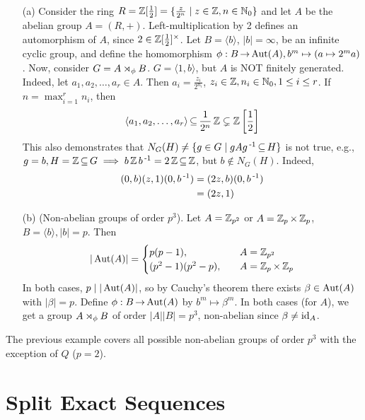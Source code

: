 \documentclass[11pt]{book}
\theoremstyle{definition}   \newtheorem{defn}[counter]{Definition} %
\newcommand{\gen}[1]{\langle #1 \rangle}   \newcommand{\stab}[2]{\tn{Stab}_{#1}(#2)}   \newcommand{\fix}[2]{\tn{Fix}_{#1}(#2)}
\DeclareMathOperator{\ra}{\rightarrow}   \DeclareMathOperator{\Poly}{\mathbf{P}}   \DeclareMathOperator{\spn}{\textnormal{span}}   \DeclareMathOperator{\aut}{\textnormal{Aut}}
\newcommand{\vs}{\vspace{8pt}}
\numberwithin{counter}{chapter}
\begin{document}
\vs

\begin{example}
\
\begin{enumerate}
\item[(a)] Consider the ring $R = \operatorname{\mathbb{Z}}[\frac{1}{2}] = \{\frac{z}{2^n} \mid z \in \operatorname{\mathbb{Z}}, n \in \operatorname{\mathbb{N}}_0\}$ and let $A$ be the abelian group $A = (R,+)$. Left-multiplication by 2 defines an automorphism of $A$, since $2 \in \operatorname{\mathbb{Z}}[\frac{1}{2}]^{\times}$. Let $B = \gen{b}$, $|b| = \infty$, be an infinite cyclic group, and define the homomorphism $\phi : B \ra \aut(A), b^m \mapsto (a \mapsto 2^m a)$. Now, consider $G = A \rtimes_{\phi} B$. $G = \gen{1,b}$, but $A$ is NOT finitely generated. Indeed, let $a_1,a_2,\dots,a_r \in A$. Then $a_i = \frac{z_i}{2^{n_i}}$, $z_i \in \operatorname{\mathbb{Z}}, n_i \in \operatorname{\mathbb{N}}_0, 1 \leq i \leq r$. If $n = \max_{i=1}^r n_i$, then
	\[\gen{a_1,a_2,\dots,a_r} \sub \frac{1}{2^n} \z \subsetneq \z\left[\frac{1}{2}\right] \]
This also demonstrates that $N_G(H) \ne \{g \in G \mid gAg\operatorname{^{-1}} \operatorname{\subseteq} H\}$ is not true, e.g., $g = b, H = \operatorname{\mathbb{Z}} \operatorname{\subseteq} G \implies b\operatorname{\mathbb{Z}} b\operatorname{^{-1}} = 2\operatorname{\mathbb{Z}} \operatorname{\subseteq} \operatorname{\mathbb{Z}}$, but $b \notin N_G(H)$. Indeed,
	\begin{align*}
	(0,b)(z,1)(0,b\operatorname{^{-1}}) &= (2z,b)(0,b\operatorname{^{-1}}) \\
	&= (2z,1)
	\end{align*}

\item[(b)] (Non-abelian groups of order $p^3$). Let $A = \operatorname{\mathbb{Z}}_{p^2}$ or $A = \operatorname{\mathbb{Z}}_p \times \operatorname{\mathbb{Z}}_p$, $B = \gen{b}, |b| = p$. Then
	\[ |\aut(A)| = \begin{cases}
	p(p-1), \quad & A = \z_{p^2} \\
	(p^2-1)(p^2-p), \quad & A = \z_p \times \z_p
	\end{cases} \]
In both cases, $p \mid |\aut(A)|$, so by Cauchy's theorem there exists $\beta \in \aut(A)$ with $|\beta| = p$. Define $\phi : B \ra \aut(A)$ by $b^m \mapsto \beta^m$. In both cases (for $A$), we get a group $A \rtimes_{\phi} B$ of order $|A| |B| = p^3$, non-abelian since $\beta \ne \textnormal{id}_A$.
\end{enumerate}
\end{example}

\vs

\begin{remark*}
The previous example covers all possible non-abelian groups of order $p^3$ with the exception of $Q$ ($p=2$).
\end{remark*}

\vs

\section*{Split Exact Sequences}
\end{document}
